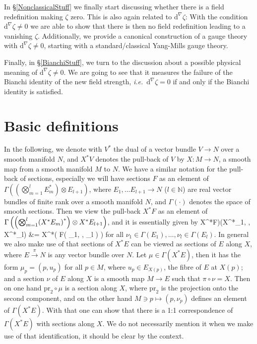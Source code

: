 \documentclass[preprint]{elsarticle}
\def\bas#1\eas{\begin{align*}#1\end{align*}}
\theoremstyle{plain}
\theoremstyle{remark}
\theoremstyle{definition}
\begin{document}
In \S \ref{NonclassicalStuff} we finally start discussing whether there is a field redefinition making $\zeta$ zero.
This is also again related to $\mathrm{d}^\nabla \zeta$: With the condition $\mathrm{d}^\nabla \zeta \neq 0$ we are able to show that there is then no field redefinition leading to a vanishing $\zeta$. Additionally, we provide a canonical construction of a gauge theory with $\mathrm{d}^\nabla \zeta \neq 0$, starting with a standard/classical Yang-Mills gauge theory.

Finally, in \S \ref{BianchiStuff}, we turn to the discussion about a possible physical meaning of $\mathrm{d}^\nabla \zeta \neq 0$. We are going to see that it measures the failure of the Bianchi identity of the new field strength, \textit{i.e.}~$\mathrm{d}^\nabla \zeta = 0$ if and only if the Bianchi identity is satisfied.
\section{Basic definitions}\label{BasicDefinitions}

In the following, we denote with $V^*$ the dual of a vector bundle $V \to N$ over a smooth manifold $N$, and $X^*V$ denotes the pull-back of $V$ by $X: M \to N$, a smooth map from a smooth manifold $M$ to $N$. We have a similar notation for the pull-back of sections, especially we will have sections $F$ as an element of $\Gamma\left( \left(\bigotimes_{m=1}^{l} E_m^*\right) \otimes E_{l+1} \right)$, where $E_1, \dots E_{l+1} \to N$ ($l \in \mathbb{N}$) are real vector bundles of finite rank over a smooth manifold $N$, and $\Gamma(\cdot)$ denotes the space of smooth sections. Then we view the pull-back $X^*F$ as an element of $\Gamma\left( \mleft(\bigotimes_{m=1}^{l} \mleft(X^*E_m\mright)^*\mright) \otimes X^*E_{l+1} \right)$, and it is essentially given by
\bas
	(X^*F)(X^*\nu_1, \dotsc , X^*\nu_l)
	&=
	X^*\mleft( F\mleft( \nu_1, \dotsc, \nu_l \mright) \mright)
\eas
for all $\nu_1 \in \Gamma(E_1), \dotsc, \nu_l \in \Gamma(E_l)$. In general we also make use of that sections of $X^*E$ can be viewed as sections of $E$ along $X$, where $E \stackrel{\pi}{\to} N$ is any vector bundle over $N$. Let $\mu \in \Gamma(X^*E)$, then it has the form $\mu_p = (p, u_p)$ for all $p \in M$, where $u_p \in E_{X(p)}$, the fibre of $E$ at $X(p)$; and a section $\nu$ of $E$ along $X$ is a smooth map $M \to E$ such that $\pi \circ \nu = X$. Then on one hand $\mathrm{pr}_2 \circ \mu$ is a section along $X$, where $\mathrm{pr}_2$ is the projection onto the second component, and on the other hand $M \ni p \mapsto (p, \nu_p)$ defines an element of $\Gamma(X^*E)$. With that one can show that there is a 1:1 correspondence of $\Gamma(X^*E)$ with sections along $X$. We do not necessarily mention it when we make use of that identification, it should be clear by the context.
\end{document}
